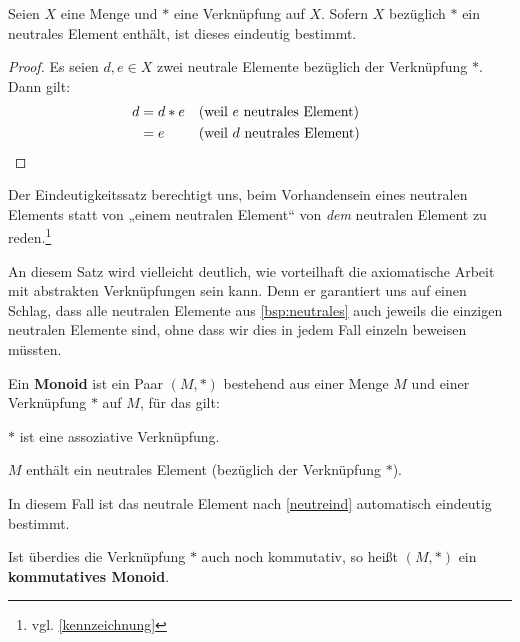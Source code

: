\begin{satz} \label{neutreind}
    Seien $X$ eine Menge und $*$ eine Verknüpfung auf $X$. Sofern $X$ bezüglich $*$ ein neutrales Element enthält, ist dieses eindeutig bestimmt.
\end{satz}
\begin{proof}
    Es seien $d,e\in X$ zwei neutrale Elemente bezüglich der Verknüpfung $*$. Dann gilt:
    \begin{align*}
        d & = d*e && (\text{weil $e$ neutrales Element}) \\
        & = e && (\text{weil $d$ neutrales Element}) && \qedhere
    \end{align*}
\end{proof}


\begin{bem}
    Der Eindeutigkeitssatz berechtigt uns, beim Vorhandensein eines neutralen Elements statt von „einem neutralen Element“ von \emph{dem} neutralen Element zu reden.\footnote{vgl. \cref{kennzeichnung}}
    
    An diesem Satz wird vielleicht deutlich, wie vorteilhaft die axiomatische Arbeit mit abstrakten Verknüpfungen sein kann. Denn er garantiert uns auf einen Schlag, dass alle neutralen Elemente aus \cref{bsp:neutrales} auch jeweils die einzigen neutralen Elemente sind, ohne dass wir dies in jedem Fall einzeln beweisen müssten.
\end{bem}


\begin{defin}[Monoid] 
    Ein \textbf{Monoid} ist ein Paar $(M,*)$ bestehend aus einer Menge $M$ und einer Verknüpfung $*$ auf $M$, für das gilt:
    \begin{labeling}[(M1), labelindent=1.5em]
        \item $*$ ist eine assoziative Verknüpfung.
        \item $M$ enthält ein neutrales Element (bezüglich der Verknüpfung $*$).
    \end{labeling}
    In diesem Fall ist das neutrale Element nach \cref{neutreind} automatisch eindeutig bestimmt.
    
    Ist überdies die Verknüpfung $*$ auch noch kommutativ, so heißt $(M,*)$ ein \textbf{kommutatives Monoid}.
\end{defin}


